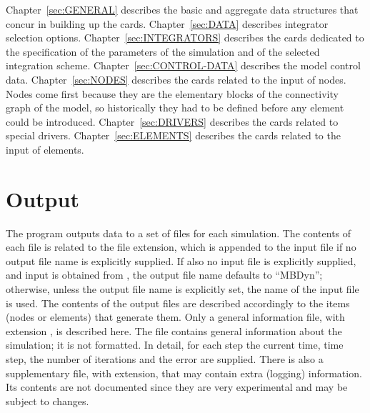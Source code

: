 Chapter~\ref{sec:GENERAL} describes the basic and aggregate
data structures that concur in building up the cards.
Chapter~\ref{sec:DATA} describes integrator selection options.
Chapter~\ref{sec:INTEGRATORS} describes the cards dedicated
to the specification of the parameters of the simulation
and of the selected integration scheme.
Chapter~\ref{sec:CONTROL-DATA} describes the model control data.
Chapter~\ref{sec:NODES} describes the cards related to the input
of nodes.
Nodes come first because they are the elementary blocks 
of the connectivity graph of the model, so historically 
they had to be defined before any element could be introduced.
Chapter~\ref{sec:DRIVERS} describes the cards related 
to special drivers.
Chapter~\ref{sec:ELEMENTS} describes the cards related to the input
of elements.



\section{Output}
The program outputs data to a set of files for each simulation.
The contents of each file is related to the file extension,
which is appended to the input file if no output file name 
is explicitly supplied.
If also no input file is explicitly supplied, and input is obtained from 
, the output file name defaults to ``MBDyn''; otherwise, 
unless the output file name is explicitly set, the name 
of the input file is used.
The contents of the output files are described accordingly 
to the items (nodes or elements) that generate them.
Only a general information file, with extension , 
is described here. 
The file contains general information about the simulation; 
it is not formatted. 
In detail, for each step the current time, time step, the number of
iterations and the error are supplied.
There is also a supplementary file, with  extension,
that may contain extra (logging) information.
Its contents are not documented since they are very experimental
and may be subject to changes.


